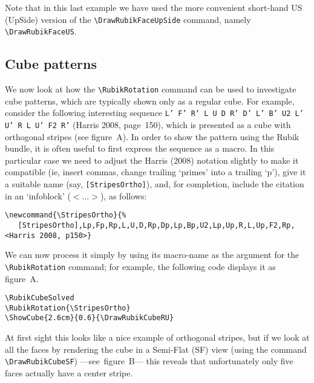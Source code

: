 \documentclass[a4paper]{article}
\begin{document}
\bigskip

{\noindent}Note that in this last example we have used the more convenient  
short-hand US (UpSide) version of the \verb!\DrawRubikFaceUpSide! command, 
namely \verb!\DrawRubikFaceUS!.



\pagebreak
\subsection{Cube patterns}

\newcommand{\CycleThreeUpEdges}{[CycleUpEdges],F2,U,Rm,Up,Up,Lm,U,Fp2}
\newcommand{\StripesOrtho}{[StripesOrtho],Lp,Fp,Rp,L,U,D, Rp,Dp,Lp,Bp,U2,Lp,Up,R,L,Up,F2,Rp,<Harris 2008, p150>}

We now look at how the \verb!\RubikRotation! command can be used to 
investigate  cube  patterns, which are typically shown only as a 
regular cube. For example, consider the following interesting sequence  
\linebreak\texttt{L' F' R' L U D R' D' L' B' U2 L' U' R L U' F2 R'} 
(Harris 2008, page~150), which is presented as a cube with orthogonal 
stripes (see figure~A). In order to show  the pattern using the Rubik
 bundle, it is often useful to first express the sequence as a macro. 
 In this particular case we need to  adjust the Harris (2008) notation 
 slightly to make it compatible (ie, insert commas, change trailing 
 `primes' into a trailing `p'), give it a suitable name 
 (say, \verb![StripesOrtho]!), and, for completion, include the citation 
in an `infoblock' ($<$...$>$), as follows:

\begin{verbatim}
\newcommand{\StripesOrtho}{%
   [StripesOrtho],Lp,Fp,Rp,L,U,D,Rp,Dp,Lp,Bp,U2,Lp,Up,R,L,Up,F2,Rp,<Harris 2008, p150>} 
\end{verbatim}
We can now  process it simply by using its macro-name  as the argument for 
the  \verb!\RubikRotation! command; for example, the following code displays 
it as figure~A. 

\begin{verbatim}
\RubikCubeSolved
\RubikRotation{\StripesOrtho}
\ShowCube{2.6cm}{0.6}{\DrawRubikCubeRU}
\end{verbatim}

At first sight this looks like a nice example of orthogonal stripes, 
but if we look at all the faces  by rendering the cube  in a Semi-Flat 
(SF) view (using the command \verb!\DrawRubikCubeSF!)
 ---see~figure~B--- this reveals that unfortunately only five faces 
actually have a center stripe.
\end{document}
